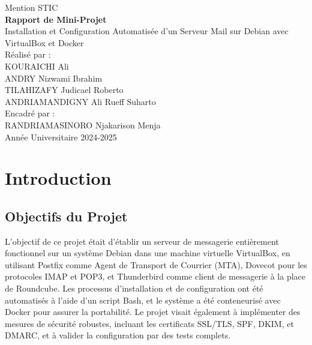\documentclass[a4paper,12pt]{article}
\begin{document}
\begin{titlepage}
    \vspace{1cm}
    {\large Mention STIC}\\
    
    \vspace{2cm}
    {\Huge \textbf{Rapport de Mini-Projet}}\\
    \vspace{1cm}
    {\LARGE Installation et Configuration Automatisée d'un Serveur Mail sur Debian avec VirtualBox et Docker}\\
    \vspace{2cm}
    {\large Réalisé par :}\\
    \vspace{0.5cm}   
    {\normalsize KOURAICHI Ali}\\
    {\normalsize ANDRY Nizwami Ibrahim}\\
    {\normalsize TILAHIZAFY Judicael Roberto}\\
    {\normalsize ANDRIAMANDIGNY Ali Rueff Suharto}\\
    \vspace{1cm}
    {\large Encadré par :}\\
    \vspace{0.5cm}
    {\normalsize RANDRIAMASINORO Njakarison Menja}\\
    \vspace{2cm}
    {\large Année Universitaire 2024-2025}\\
\end{titlepage}

\tableofcontents
\newpage

\section{Introduction}

\subsection{Objectifs du Projet}
L'objectif de ce projet était d'établir un serveur de messagerie entièrement fonctionnel sur un système Debian dans une machine virtuelle VirtualBox, en utilisant Postfix comme Agent de Transport de Courrier (MTA), Dovecot pour les protocoles IMAP et POP3, et Thunderbird comme client de messagerie à la place de Roundcube. Les processus d'installation et de configuration ont été automatisés à l'aide d'un script Bash, et le système a été conteneurisé avec Docker pour assurer la portabilité. Le projet visait également à implémenter des mesures de sécurité robustes, incluant les certificats SSL/TLS, SPF, DKIM, et DMARC, et à valider la configuration par des tests complets.
\end{document}
